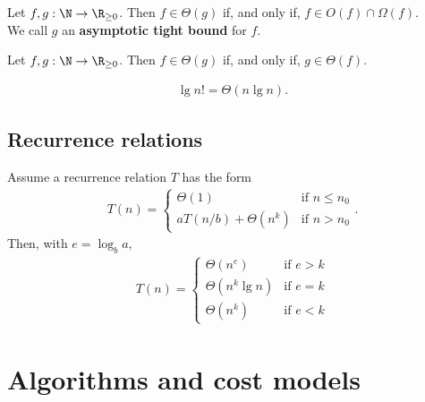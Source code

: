 \documentclass{article}
\begin{document}
\begin{definition}
	Let $f,g:\N\to\R_{\geq 0}$. Then $f\in\Theta(g)$ if, and only if, $f\in O(f) \cap \Omega(f)$.\\
	We call $g$ an \textbf{asymptotic tight bound} for $f$.
\end{definition}
\begin{theorem}
	Let $f,g:\N\to\R_{\geq 0}$. Then $f\in\Theta(g)$ if, and only if, $g\in\Theta(f)$.
\end{theorem}
\begin{theorem}
	\begin{align*}
		\lg n! = \Theta(n \lg n).
	\end{align*}
\end{theorem}


\subsection{Recurrence relations}


\begin{theorem}
	Assume a recurrence relation $T$ has the form
	\begin{align*}
		T(n) = \begin{cases}
			\Theta(1) &\text{if $n\leq n_0$}\\
			aT(n/b) + \Theta(n^k) &\text{if $n>n_0$}
		\end{cases}.
	\end{align*}
	Then, with $e=\log_b a$, 
	\begin{align*}
		T(n) = \begin{cases}
			\Theta(n^e) &\text{if $e>k$}\\
			\Theta(n^k\lg n) &\text{if $e=k$}\\
			\Theta(n^k) &\text{if $e<k$}
		\end{cases}
	\end{align*}
\end{theorem}



\section{Algorithms and cost models}
\end{document}
